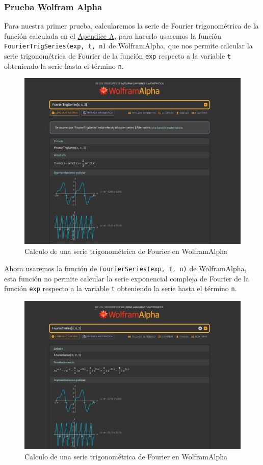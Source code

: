\subsubsection{Prueba Wolfram Alpha}
Para nuestra primer prueba, calcularemos la serie de Fourier trigonométrica de la función calculada en el  \hyperref[app1:trig-coeff]{Apendice A}, para hacerlo usaremos la función \texttt{FourierTrigSeries(exp, t, n)} de WolframAlpha, que nos permite calcular la serie trigonométrica de Fourier de la función \texttt{exp} respecto a la variable \texttt{t} obteniendo la serie hasta el término \texttt{n}.
\begin{figure}[H]
	\centering
	\includegraphics[width=1\textwidth]{img/chapter02/wolfram_trig_series.png}
	\caption{Calculo de una serie trigonométrica de Fourier en WolframAlpha}
	\label{fig:wolfram-trig-series}  %
\end{figure}
Ahora usaremos la función de \texttt{FourierSeries(exp, t, n)} de WolframAlpha, esta función no permite calcular la serie exponencial compleja de Fourier de la función \texttt{exp} respecto a la variable \texttt{t} obteniendo la serie hasta el término \texttt{n}.
\begin{figure}[H]
	\centering
	\includegraphics[width=1\textwidth]{img/chapter02/wolfram_complex_series.png}
	\caption{Calculo de una serie trigonométrica de Fourier en WolframAlpha}
	\label{fig:wolfram-exp-series}  %
\end{figure}
